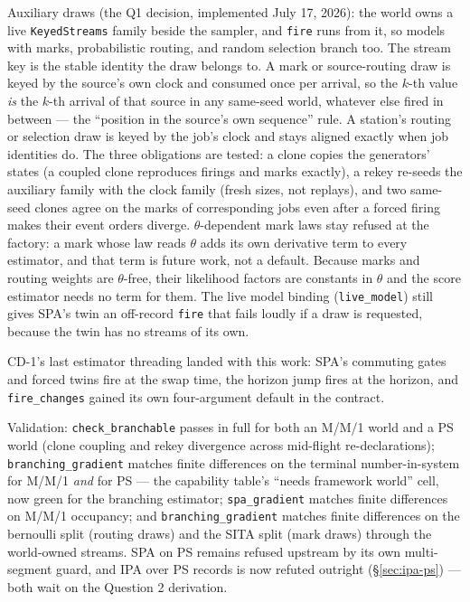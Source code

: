 \documentclass[11pt]{article}
\newcommand{\code}[1]{\texttt{#1}}
\begin{document}
Auxiliary draws (the Q1 decision, implemented July 17, 2026): the world
owns a live \code{KeyedStreams} family beside the sampler, and
\code{fire} runs from it, so models with marks, probabilistic routing, and
random selection branch too. The stream key is the stable identity the
draw belongs to. A mark or source-routing draw is keyed by the source's
own clock and consumed once per arrival, so the $k$-th value \emph{is} the
$k$-th arrival of that source in any same-seed world, whatever else fired
in between --- the ``position in the source's own sequence'' rule. A
station's routing or selection draw is keyed by the job's clock and stays
aligned exactly when job identities do. The three obligations are tested:
a clone copies the generators' states (a coupled clone reproduces firings
and marks exactly), a rekey re-seeds the auxiliary family with the clock
family (fresh sizes, not replays), and two same-seed clones agree on the
marks of corresponding jobs even after a forced firing makes their event
orders diverge. $\theta$-dependent mark laws stay refused at the factory:
a mark whose law reads $\theta$ adds its own derivative term to every
estimator, and that term is future work, not a default. Because marks and
routing weights are $\theta$-free, their likelihood factors are constants
in $\theta$ and the score estimator needs no term for them. The live model
binding (\code{live\_model}) still gives SPA's twin an off-record
\code{fire} that fails loudly if a draw is requested, because the twin has
no streams of its own.

CD-1's last estimator threading landed with this work: SPA's commuting
gates and forced twins fire at the swap time, the horizon jump fires at the
horizon, and \code{fire\_changes} gained its own four-argument default in
the contract.

Validation: \code{check\_branchable} passes in full for both an M/M/1 world
and a PS world (clone coupling and rekey divergence across mid-flight
re-declarations); \code{branching\_gradient} matches finite differences on
the terminal number-in-system for M/M/1 \emph{and} for PS — the capability
table's ``needs framework world'' cell, now green for the branching
estimator; \code{spa\_gradient} matches finite differences on M/M/1
occupancy; and \code{branching\_gradient} matches finite differences on
the bernoulli split (routing draws) and the SITA split (mark draws)
through the world-owned streams. SPA on PS remains refused upstream by
its own multi-segment guard, and IPA over PS records is now refuted
outright (\S\ref{sec:ipa-ps}) — both wait on the Question 2 derivation.
\end{document}
